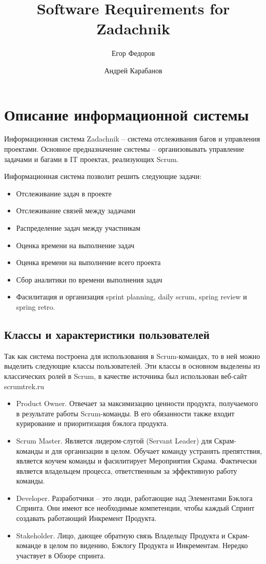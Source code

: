 \documentclass{article}
\author{Егор Федоров \and Андрей Карабанов}
\title{Software Requirements for Zadachnik}
\begin{document}
\maketitle
\tableofcontents

\section{Описание информационной системы}
Информационная система Zadachnik -- система отслеживания багов и
управления проектами.
Основное предназначение системы -- организовывать управление задачами и багами
в IT проектах, реализующих Scrum.

Информационная система позволит решить следующие задачи:
\begin{itemize}
  \item Отслеживание задач в проекте
  \item Отслеживание связей между задачами
  \item Распределение задач между участникам
  \item Оценка времени на выполнение задач
  \item Оценка времени на выполнение всего проекта
  \item Сбор аналитики по времени выполнения задач
  \item Фасилитация и организация sprint planning, daily scrum, spring review и spring retro.
\end{itemize}

\subsection{Классы и характеристики пользователей}
Так как система построена для использования в Scrum-командах, то в ней
можно выделить следующие классы пользователей. Эти классы в основном выделены из
классических ролей в Scrum, в качестве источника был использован веб-сайт scrumtrek.ru
\begin{itemize}
\item Product Owner. Отвечает за максимизацию ценности продукта, получаемого в результате работы Scrum-команды.
В его обязанности также входит курирование и приоритизация бэклога продукта. 
\item Scrum Master. Является лидером-слугой (Servant Leader) для Скрам-команды и для организации в целом.
Обучает команду устранять препятствия, является коучем команды и фасилитирует Мероприятия Скрама.
Фактически является владельцем процесса, ответственным за эффективную работу команды.
\item Developer. Разработчики -- это люди, работающие над Элементами Бэклога Спринта.
Они имеют все необходимые компетенции, чтобы каждый Спринт создавать работающий Инкремент Продукта.
\item Stakeholder. Лицо, дающее обратную связь Владельцу Продукта и Скрам-команде в целом по видению,
Бэклогу Продукта и Инкрементам. Нередко участвует в Обзоре спринта.
\end{itemize}
\end{document}
